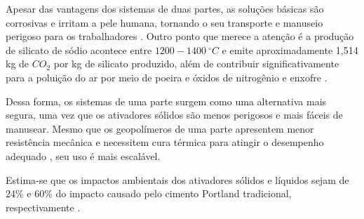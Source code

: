 Apesar das vantagens dos sistemas de duas partes, as soluções básicas são corrosivas e irritam a pele humana, tornando o seu transporte e manuseio perigoso para os trabalhadores \cite{awoyera2019critical}.
Outro ponto que merece a atenção é a produção de silicato de sódio acontece entre $1200-1400\ ^\circ C$ e emite aproximadamente 1,514 kg de $CO_2$ por kg de silicato produzido, além de contribuir significativamente para a poluição do ar por meio de poeira e óxidos de nitrogênio e enxofre \cite{rajan2020sustainable}.

Dessa forma, os sistemas de uma parte surgem como uma alternativa mais segura, uma vez que os ativadores sólidos são menos perigosos e mais fáceis de manusear. Mesmo que os geopolímeros de uma parte apresentem menor resistência mecânica e necessitem cura térmica para atingir o desempenho adequado \cite{provis2018alkali}, seu uso é mais escalável.

Estima-se que os impactos ambientais dos ativadores sólidos e líquidos sejam de 24\% e 60\% do impacto causado pelo cimento Portland tradicional, respectivamente \cite{luukkonen2017review}.